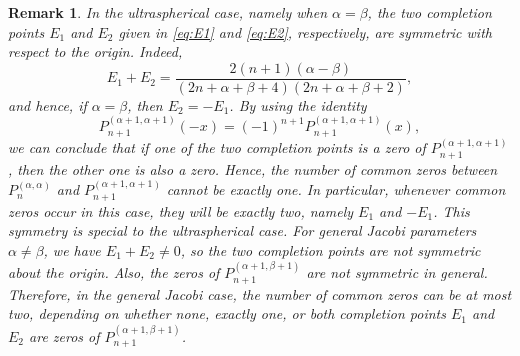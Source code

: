 \documentclass[final,3p,times,12pt]{elsarticle}
\newtheorem{remark}{Remark}[section]
\numberwithin{equation}{section}  %
\begin{document}
    \begin{remark}\label{Symmetricevencommonzeros}
		In the ultraspherical case, namely when $\alpha=\beta$, the two completion
		points $E_{1}$ and $E_{2}$ given in \eqref{eq:E1} and \eqref{eq:E2}, respectively, are symmetric
		with respect to the origin. Indeed,
		\begin{equation*}
			E_{1}+E_2
			=
			\frac{2(n+1)(\alpha-\beta)}
			{(2n+\alpha+\beta+4)(2n+\alpha+\beta+2)} ,
		\end{equation*}
		and hence, if $\alpha=\beta$, then $E_2=-E_1$. By using the identity \cite[page 59]{Szego-OP-Book}
		\begin{equation*}
			P_{n+1}^{(\alpha+1,\alpha+1)}(-x)
			=
			(-1)^{n+1}P_{n+1}^{(\alpha+1,\alpha+1)}(x),
		\end{equation*}
		we can conclude that if one of the two completion points is a zero of
		$P_{n+1}^{(\alpha+1,\alpha+1)}$, then the other one is also a zero. Hence,
		the number of common zeros between $P_{n}^{(\alpha,\alpha)}$ and $P_{n+1}^{(\alpha+1,\alpha+1)}$ cannot be exactly one. 
		In particular, whenever common zeros occur in this case, they will be exactly two, namely 
		$E_1$ and $-E_1$. This symmetry is special to the ultraspherical case. For general Jacobi
		parameters $\alpha\neq\beta$, we have $E_1+E_2\neq0$,
		so the two completion points are not symmetric about the origin. Also, the zeros of $P_{n+1}^{(\alpha+1,\beta+1)}$ are not symmetric in general.
		Therefore, in the general Jacobi case, the number of common zeros can be at most two,
		depending on whether none, exactly one, or both completion points
		$E_1$ and $E_2$ are zeros of
		$P_{n+1}^{(\alpha+1,\beta+1)}$.
	\end{remark}
\end{document}
